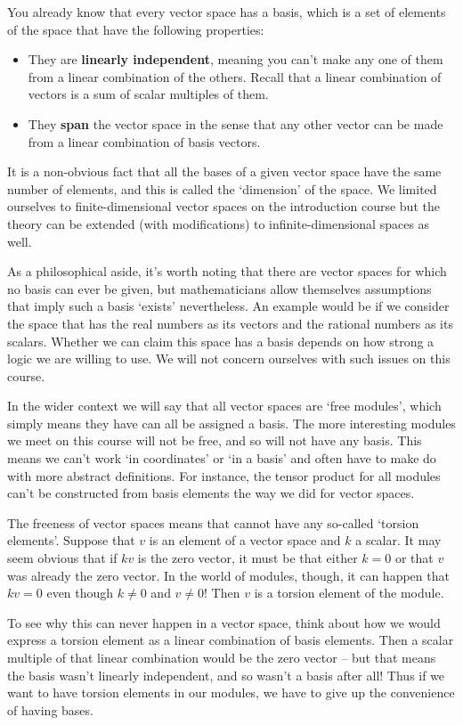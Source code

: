 \documentclass[oneside,english]{amsbook}
\numberwithin{section}{chapter}
\theoremstyle{plain}
\theoremstyle{definition}
\begin{document}
			You already know that every vector space has a basis, which is a set of elements of the space that have the following properties:
			\begin{itemize}
				\item They are \textbf{linearly independent}, meaning you can't make any one of them from a linear combination of the others. Recall that a linear combination of vectors is a sum of scalar multiples of them.
				\item They \textbf{span} the vector space in the sense that any other vector can be made from a linear combination of basis vectors.
			\end{itemize}
			It is a non-obvious fact that all the bases of a given vector space have the same number of elements, and this is called the `dimension' of the space. We limited ourselves to finite-dimensional vector spaces on the introduction course but the theory can be extended (with modifications) to infinite-dimensional spaces as well.
			
			As a philosophical aside, it's worth noting that there are vector spaces for which no basis can ever be given, but mathematicians allow themselves assumptions that imply such a basis `exists' nevertheless. An example would be if we consider the space that has the real numbers as its vectors and the rational numbers as its scalars. Whether we can claim this space has a basis depends on how strong a logic we are willing to use. We will not concern ourselves with such issues on this course.

			In the wider context we will say that all vector spaces are `free modules', which simply means they have can all be assigned a basis. The more interesting modules we meet on this course will not be free, and so will not have any basis. This means we can't work `in coordinates' or `in a basis' and often have to make do with more abstract definitions. For instance, the tensor product for all modules can't be constructed from basis elements the way we did for vector spaces.
			
			The freeness of vector spaces means that cannot have any so-called `torsion elements'. Suppose that $v$ is an element of a vector space and $k$ a scalar. It may seem obvious that if $kv$ is the zero vector, it must be that either $k = 0$ or that $v$ was already the zero vector. In the world of modules, though, it can happen that $kv = 0$ even though $k\ne 0$ and $v\ne 0$! Then $v$ is a torsion element of the module.
			
			To see why this can never happen in a vector space, think about how we would express a torsion element as a linear combination of basis elements. Then a scalar multiple of that linear combination would be the zero vector -- but that means the basis wasn't linearly independent, and so wasn't a basis after all! Thus if we want to have torsion elements in our modules, we have to give up the convenience of having bases.
			
\end{document}
